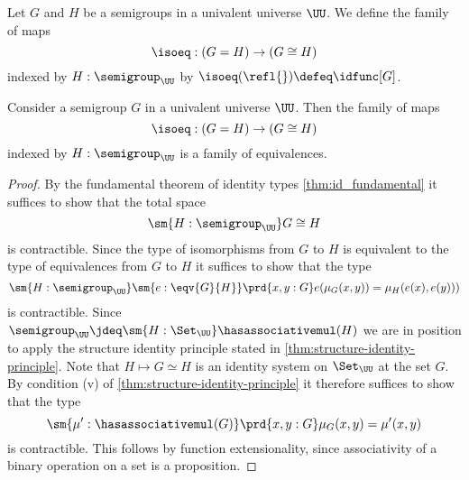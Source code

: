 \begin{defn}
Let $G$ and $H$ be a semigroups in a univalent universe $\UU$. We define the family of maps
\begin{equation*}
\isoeq : (G=H)\to (G\cong H)
\end{equation*}
indexed by $H:\semigroup_\UU$ by $\isoeq(\refl{})\defeq\idfunc[G]$.
\end{defn}

\begin{thm}\label{thm:iso-eq-semigroup}
Consider a semigroup $G$ in a univalent universe $\UU$. Then the family of maps
\begin{equation*}
\isoeq : (G=H)\to (G\cong H)
\end{equation*}
indexed by $H:\semigroup_\UU$ is a family of equivalences.
\end{thm}

\begin{proof}
By the fundamental theorem of identity types \cref{thm:id_fundamental} it suffices to show that the total space
\begin{equation*}
\sm{H:\semigroup_\UU}G\cong H
\end{equation*}
is contractible. Since the type of isomorphisms from $G$ to $H$ is equivalent to the type of equivalences from $G$ to $H$ it suffices to show that the type
\begin{equation*}
  \sm{H:\semigroup_\UU}\sm{e:\eqv{G}{H}}\prd{x,y:G}e(\mu_G(x,y))=\mu_{H}(e(x),e(y)))
\end{equation*}
is contractible. Since $\semigroup_\UU\jdeq\sm{H:\Set_\UU}\hasassociativemul(H)$ we are in position to apply the structure identity principle stated in \cref{thm:structure-identity-principle}. Note that $H\mapsto G\simeq H$ is an identity system on $\Set_\UU$ at the set $G$. By condition (v) of \cref{thm:structure-identity-principle} it therefore suffices to show that the type
\begin{equation*}
  \sm{\mu':\hasassociativemul(G)}\prd{x,y:G}\mu_G(x,y)=\mu'(x,y)
\end{equation*}
is contractible. This follows by function extensionality, since associativity of a binary operation on a set is a proposition.
\end{proof}

